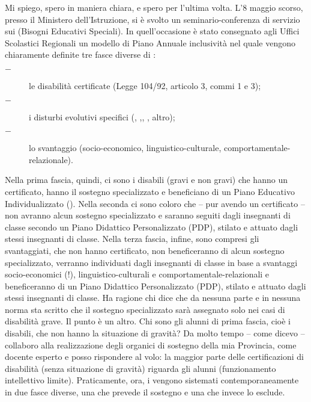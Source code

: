 Mi spiego, spero in maniera chiara, e spero per l'ultima volta. L’8 maggio scorso, presso il Ministero dell'Istruzione, si è svolto un seminario-conferenza di servizio sui  (Bisogni Educativi Speciali). In quell'occasione è stato consegnato agli Uffici Scolastici Regionali un modello di Piano Annuale inclusività nel quale vengono chiaramente definite tre fasce diverse di :
\begin{description}
	\item[$-$]  le disabilità certificate (Legge 104/92, articolo 3, commi 1 e 3);
	\item [$-$]i disturbi evolutivi specifici (,  ,, , altro); %
	\item [$-$]lo svantaggio (socio-economico, linguistico-culturale, comportamentale-relazionale).
\end{description}
Nella prima fascia, quindi, ci sono i disabili (gravi e non gravi) che hanno un certificato, hanno il sostegno specializzato e beneficiano di un Piano Educativo Individualizzato (). Nella seconda ci sono coloro che – pur avendo un certificato – non avranno alcun sostegno specializzato e saranno seguiti dagli insegnanti di classe secondo un Piano Didattico Personalizzato (PDP), stilato e attuato dagli stessi insegnanti di classe. Nella terza fascia, infine, sono compresi gli svantaggiati, che non hanno certificato, non beneficeranno di alcun sostegno specializzato, verranno individuati dagli insegnanti di classe in base a svantaggi socio-economici (!), linguistico-culturali e comportamentale-relazionali e beneficeranno di un Piano Didattico Personalizzato (PDP), stilato e attuato dagli stessi insegnanti di classe.
Ha ragione chi dice che da nessuna parte e in nessuna norma sta scritto che il sostegno specializzato sarà assegnato solo nei casi di disabilità grave. Il punto è un altro. Chi sono gli alunni di prima fascia, cioè i disabili, che non hanno la situazione di gravità? Da molto tempo – come dicevo – collaboro alla realizzazione degli organici di sostegno della mia Provincia, come docente esperto e posso rispondere al volo: la maggior parte delle certificazioni di disabilità (senza situazione di gravità) riguarda gli alunni  (funzionamento intellettivo limite). Praticamente, ora, i  vengono sistemati contemporaneamente in due fasce diverse, una che prevede il sostegno e una che invece lo esclude.

